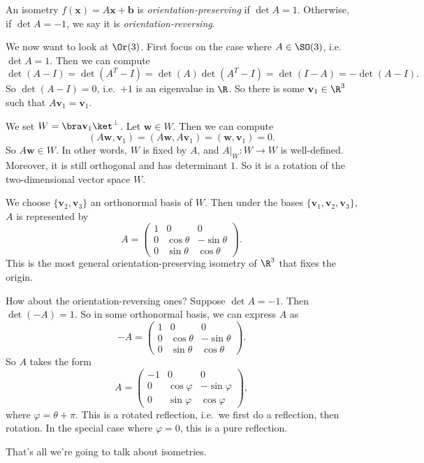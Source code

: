 \documentclass[a4paper]{article}
\begin{document}
\begin{defi}
  An isometry $f(\mathbf{x}) = A\mathbf{x} + \mathbf{b}$ is \emph{orientation-preserving} if $\det A = 1$. Otherwise, if $\det A = -1$, we say it is \emph{orientation-reversing}.
\end{defi}

\begin{eg}
  We now want to look at $\Or(3)$. First focus on the case where $A \in \SO(3)$, i.e.\ $\det A = 1$. Then we can compute
  \[
    \det(A - I) = \det(A^T - I) = \det(A)\det(A^T - I) = \det(I - A) = -\det(A - I).
  \]
  So $\det (A - I) = 0$, i.e.\ $+1$ is an eigenvalue in $\R$. So there is some $\mathbf{v}_1 \in \R^3$ such that $A\mathbf{v}_1 = \mathbf{v}_1$.

  We set $W = \bra \mathbf{v}_1\ket^{\perp}$. Let $\mathbf{w} \in W$. Then we can compute
  \[
    (A\mathbf{w}, \mathbf{v}_1) = (A\mathbf{w}, A\mathbf{v}_1) = (\mathbf{w}, \mathbf{v}_1) = 0.
  \]
  So $A\mathbf{w} \in W$. In other words, $W$ is fixed by $A$, and $A|_{W}: W \to W$ is well-defined. Moreover, it is still orthogonal and has determinant $1$. So it is a rotation of the two-dimensional vector space $W$.

  We choose $\{\mathbf{v}_2, \mathbf{v}_3\}$ an orthonormal basis of $W$. Then under the bases $\{\mathbf{v}_1, \mathbf{v}_2, \mathbf{v}_3\}$, $A$ is represented by
  \[
    A =
    \begin{pmatrix}
      1 & 0 & 0\\
      0 & \cos \theta & - \sin \theta\\
      0 & \sin \theta & \cos \theta
    \end{pmatrix}.
  \]
  This is the most general orientation-preserving isometry of $\R^3$ that fixes the origin.

  How about the orientation-reversing ones?
  Suppose $\det A = -1$. Then $\det(-A) = 1$. So in some orthonormal basis, we can express $A$ as
  \[
    -A =
    \begin{pmatrix}
      1 & 0 & 0\\
      0 & \cos \theta & - \sin \theta\\
      0 & \sin \theta & \cos \theta
    \end{pmatrix}.
  \]
  So $A$ takes the form
  \[
    A =
    \begin{pmatrix}
      -1 & 0 & 0\\
      0 & \cos \varphi & -\sin \varphi\\
      0 & \sin \varphi & \cos \varphi
    \end{pmatrix},
  \]
  where $\varphi = \theta + \pi$. This is a rotated reflection, i.e.\ we first do a reflection, then rotation. In the special case where $\varphi = 0$, this is a pure reflection.
\end{eg}
That's all we're going to talk about isometries.
\end{document}
